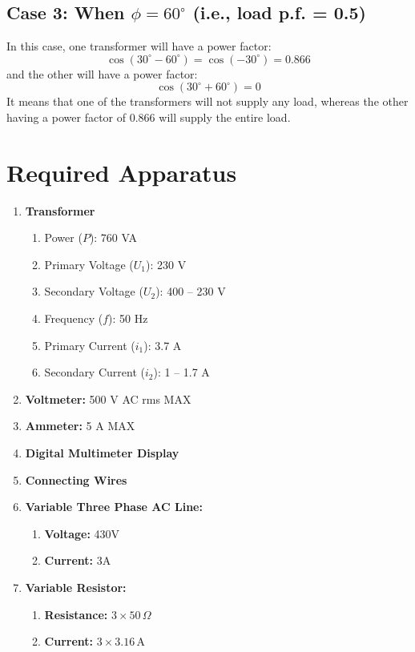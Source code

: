 \documentclass[a4paper,12pt]{article}
\begin{document}
	\subsection*{Case 3: When $\phi = 60^\circ$ (i.e., load p.f. = 0.5)}
	In this case, one transformer will have a power factor:
	\[
	\cos (30^\circ - 60^\circ) = \cos (-30^\circ) = 0.866
	\]
	and the other will have a power factor:
	\[
	\cos (30^\circ + 60^\circ) = 0
	\]
	It means that one of the transformers will not supply any load, whereas the other having a power factor of $0.866$ will supply the entire load.
	


	
	\newpage
	\section{Required Apparatus}
	\begin{enumerate}
		\item \textbf{Transformer}
		\begin{enumerate}
			\item Power (\(P\)): 760 VA
			\item Primary Voltage (\(U_1\)): 230 V
			\item Secondary Voltage (\(U_2\)): 400 -- 230 V
			\item Frequency (\(f\)): 50 Hz
			\item Primary Current (\(i_1\)): 3.7 A
			\item Secondary Current (\(i_2\)): 1 -- 1.7 A
		\end{enumerate}
		\item \textbf{Voltmeter:} 500 V AC rms MAX
		\item \textbf{Ammeter:} 5 A MAX
		\item \textbf{Digital Multimeter Display}
		\item \textbf{Connecting Wires}
		\item \textbf{Variable Three Phase AC Line:} 
		\begin{enumerate}
			\item \textbf{Voltage:} 430V
			\item \textbf{Current:} 3A
		\end{enumerate}
		\item \textbf{Variable Resistor:} 
		\begin{enumerate}
			\item \textbf{Resistance:} $3 \times 50 \, \Omega$
			\item \textbf{Current:} $3 \times 3.16 \, \mathrm{A}$
		\end{enumerate}
			\end{enumerate}
\end{document}

